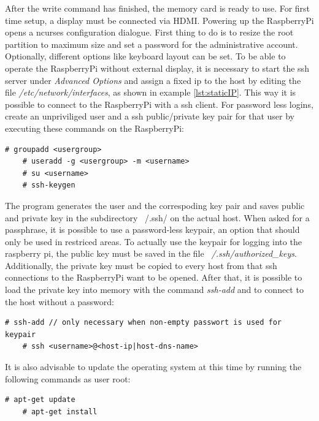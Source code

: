 After the write command has finished, the memory card is ready to use. For first time setup, a display must be connected via HDMI. Powering up the RaspberryPi
opens a ncurses configuration dialogue. First thing to do is to resize the root partition to maximum size and set a password for the administrative
account. Optionally, different options like keyboard layout can be set.
To be able to operate the RaspberryPi without external display, it is necessary to start the \gls{ssh} server under \textit{Advanced Options} and assign a 
fixed ip to the host by editing the file \textit{/etc/network/interfaces}, as shown in example \ref{lst:staticIP}. This way it is possible to connect to the
RaspberryPi with a \gls{ssh} client. For password less logins, create an unpriviliged user and
 a \gls{ssh} public/private key pair for that user by executing these commands on the RaspberryPi:

\begin{lstlisting}[style=BashInputStyle]
    # groupadd <usergroup>
    # useradd -g <usergroup> -m <username>
    # su <username>
    # ssh-keygen
\end{lstlisting}
 
The program generates the user and the correspoding key pair and saves public and private key in the subdirectory ~/.ssh/ on the actual host. When asked for a passphrase, it is possible
to use a password-less keypair, an option that should only be used in restriced areas.
To actually use the keypair for logging into
the raspberry pi, the public key must be saved in the file \textit{~/.ssh/authorized\_keys}. Additionally, the private key must be copied to every host
from that \gls{ssh} connections to the RaspberryPi want to be opened. After that, it is possible to load the private key into memory with the command \textit{ssh-add}
and to connect to the host without a password:

\begin{lstlisting}[style=BashInputStyle]
    # ssh-add // only necessary when non-empty passwort is used for keypair
    # ssh <username>@<host-ip|host-dns-name>
\end{lstlisting}

It is also advisable to update the operating system at this time by running the following commands as user root:

\begin{lstlisting}[style=BashInputStyle]
    # apt-get update
    # apt-get install
\end{lstlisting}

